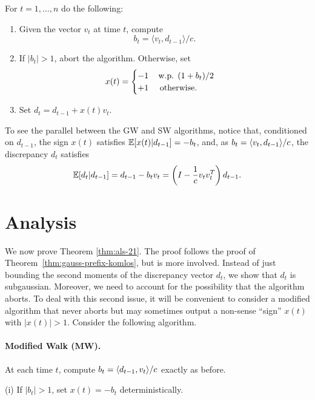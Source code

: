 \noindent For $t=1,\ldots,n$ do the following:
\begin{enumerate}
    \item Given the vector $v_t$ at time $t$, compute \begin{equation}
    \label{eq:sw-bt}
        b_t =\langle v_t, d_{t-1} \rangle/c.
    \end{equation}
    \item If $|b_t| > 1$, abort the algorithm.
Otherwise, set
\begin{equation} 
\label{eq:sw-rule}
x(t) =  \begin{cases} -1  \text { \,\,\, w.p. }  (1+b_t)/2 \\ 
  +1 \text{ \,\,\,\, otherwise}.
\end{cases}
\end{equation}
\item Set $d_t = d_{t-1} + x(t) v_t$.
\end{enumerate}
\vspace{2mm}

To see the parallel between the GW and SW algorithms, notice that,
conditioned on $d_{t-1}$, the sign $x(t)$ satisfies $\mathbb{E}[x(t) | d_{t-1}]=-b_t$, and, as $b_t = \langle v_t,d_{t-1}\rangle/c$, the discrepancy $d_t$ satisfies
\[\mathbb{E}[d_t |d_{t-1}] = d_{t-1} - b_t v_t = \left(I - \frac{1}{c}v_t v_t^T\right) d_{t-1}.\]


\section{Analysis}
We now prove Theorem \ref{thm:als-21}. The proof follows the proof of Theorem~\ref{thm:gauss-prefix-komlos}, but is more involved. Instead of just bounding the second moments of the discrepancy vector $d_t$, we show that $d_t$ is subgaussian. Moreover, we need to account for the possibility that the algorithm aborts. To deal with this second issue, it will be convenient to consider a modified algorithm that never aborts but may sometimes output a non-sense ``sign'' $x(t)$ with $|x(t)|>1$. Consider the following algorithm. 
\paragraph{Modified Walk (MW).} At each time $t$, compute $b_t = \langle d_{t-1},v_t\rangle/c$ exactly as before. 

\vspace{2mm}

(i) If $|b_t|> 1$, set $x(t) =-b_t$ deterministically.
\vspace{2mm}

